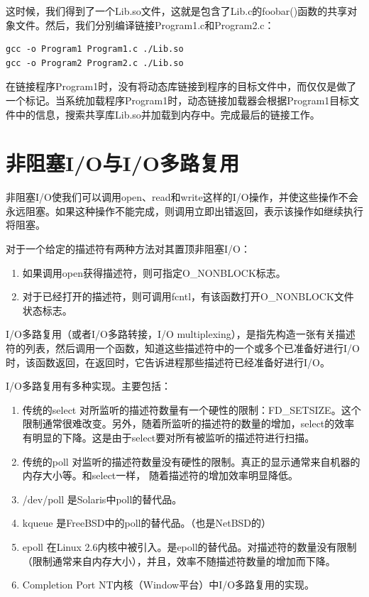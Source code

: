 \documentclass[twoside, xetex]{report}
\begin{document}
	这时候，我们得到了一个Lib.so文件，这就是包含了Lib.c的foobar()函数的共享对象文件。然后，我们分别编译链接Program1.c和Program2.c：
	\begin{lstlisting}
gcc -o Program1 Program1.c ./Lib.so
gcc -o Program2 Program2.c ./Lib.so
	\end{lstlisting}
	在链接程序Program1时，没有将动态库链接到程序的目标文件中，而仅仅是做了一个标记。当系统加载程序Program1时，动态链接加载器会根据Program1目标文件中的信息，搜索共享库Lib.so并加载到内存中。完成最后的链接工作。
	
\section{非阻塞I/O与I/O多路复用}
	非阻塞I/O使我们可以调用open、read和write这样的I/O操作，并使这些操作不会永远阻塞。如果这种操作不能完成，则调用立即出错返回，表示该操作如继续执行将阻塞。
	
	对于一个给定的描述符有两种方法对其置顶非阻塞I/O：
	\begin{enumerate}
		\item 如果调用open获得描述符，则可指定O\_NONBLOCK标志。
		\item 对于已经打开的描述符，则可调用fcntl，有该函数打开O\_NONBLOCK文件状态标志。
	\end{enumerate}
	
	I/O多路复用（或者I/O多路转接，I/O multiplexing），是指先构造一张有关描述符的列表，然后调用一个函数，知道这些描述符中的一个或多个已准备好进行I/O时，该函数返回，在返回时，它告诉进程那些描述符已经准备好进行I/O。
	
	I/O多路复用有多种实现。主要包括：
	\begin{enumerate}
		\item 传统的select 对所监听的描述符数量有一个硬性的限制：FD\_SETSIZE。这个限制通常很难改变。另外，随着所监听的描述符的数量的增加，select的效率有明显的下降。这是由于select要对所有被监听的描述符进行扫描。
		\item 传统的poll 对监听的描述符数量没有硬性的限制。真正的显示通常来自机器的内存大小等。和select一样， 随着描述符的增加效率明显降低。
		\item /dev/poll 是Solaris中poll的替代品。
		\item kqueue 是FreeBSD中的poll的替代品。（也是NetBSD的）
		\item epoll 在Linux 2.6内核中被引入。是epoll的替代品。对描述符的数量没有限制（限制通常来自内存大小），并且，效率不随描述符数量的增加而下降。
		\item Completion Port NT内核（Window平台）中I/O多路复用的实现。
	\end{enumerate}
	
\end{document}
